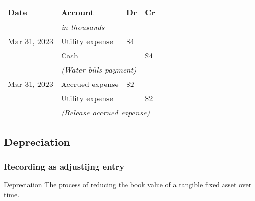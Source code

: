 \begin{tcolorbox}[colframe=black,colback=white,title=Example Adjusting Entry (Accrued Expense)]
    \vspace{1em}
    \begin{tabular}{llll}
        \textbf{Date} & \textbf{Account}                                       & \textbf{Dr} & \textbf{Cr} \\
        \hline
                      & \textit{in thousands}                                  &             &             \\
        Mar 31, 2023  & Utility expense                                        & \$4         &             \\
                      & \quad Cash                                             &             & \$4         \\
                      & \multicolumn{3}{l}{\textit{(Water bills payment)}}                                 \\
        Mar 31, 2023  & Accrued expense                                        & \$2         &             \\
                      & \quad Utility expense                                  &             & \$2         \\
                      & \multicolumn{3}{l}{\textit{(Release accrued expense)}}                             \\
    \end{tabular}
\end{tcolorbox}
\normalsize

\subsection{Depreciation}
\label{subsec:depreciation}

\subsubsection{Recording as adjustijng entry}

\begin{definition}
    {Depreciation}
    The process of reducing the book value of a tangible fixed asset over time.
\end{definition}

